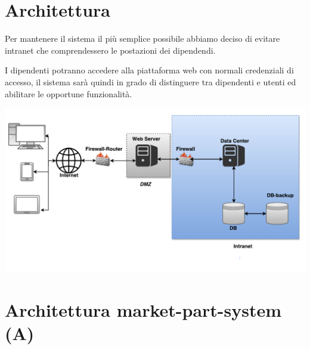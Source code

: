 \documentclass[11pt]{article} %
\begin{document}
\section{Architettura}

Per mantenere il sistema il più semplice possibile abbiamo deciso di evitare intranet che comprendessero le postazioni dei dipendendi.

I dipendenti potranno accedere alla piattaforma web con normali credenziali di accesso, il sistema sarà quindi in grado di distinguere tra dipendenti e utenti ed abilitare le opportune funzionalità.

\vspace{0.35in}
\hspace{-1.5in}
\includegraphics[scale=0.9]{Architettura1}

\section{Architettura market-part-system (A)}






\end{document}
